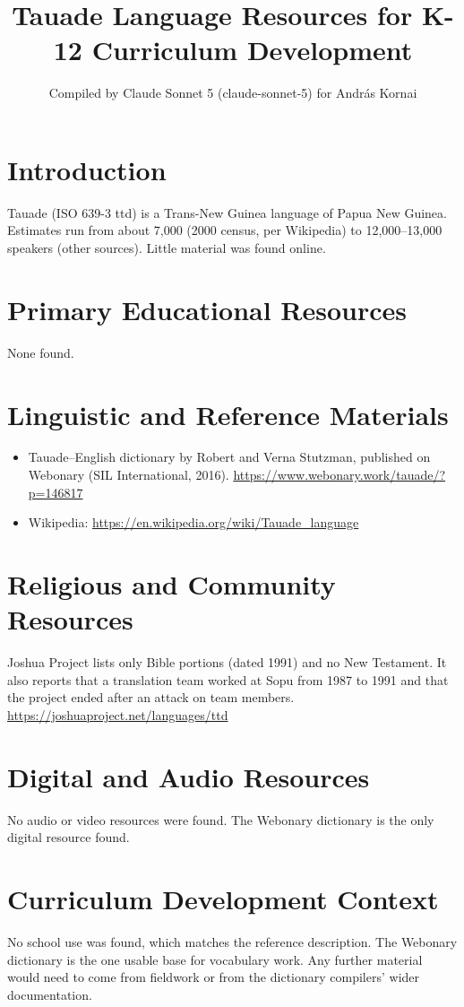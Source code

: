 \documentclass[12pt]{article}
\title{Tauade Language Resources for K-12 Curriculum Development}
\author{Compiled by Claude Sonnet 5 (claude-sonnet-5) for Andr\'as Kornai}
\date{}
\begin{document}
\maketitle

\section{Introduction}
Tauade (ISO 639-3 ttd) is a Trans-New Guinea language of Papua New Guinea. Estimates run from about 7,000 (2000 census, per Wikipedia) to 12,000--13,000 speakers (other sources). Little material was found online.

\section{Primary Educational Resources}
None found.

\section{Linguistic and Reference Materials}
\begin{itemize}
\item Tauade--English dictionary by Robert and Verna Stutzman, published on Webonary (SIL International, 2016). \url{https://www.webonary.work/tauade/?p=146817}
\item Wikipedia: \url{https://en.wikipedia.org/wiki/Tauade_language}
\end{itemize}

\section{Religious and Community Resources}
Joshua Project lists only Bible portions (dated 1991) and no New Testament. It also reports that a translation team worked at Sopu from 1987 to 1991 and that the project ended after an attack on team members. \url{https://joshuaproject.net/languages/ttd}

\section{Digital and Audio Resources}
No audio or video resources were found. The Webonary dictionary is the only digital resource found.

\section{Curriculum Development Context}
No school use was found, which matches the reference description. The Webonary dictionary is the one usable base for vocabulary work. Any further material would need to come from fieldwork or from the dictionary compilers' wider documentation.
\end{document}
